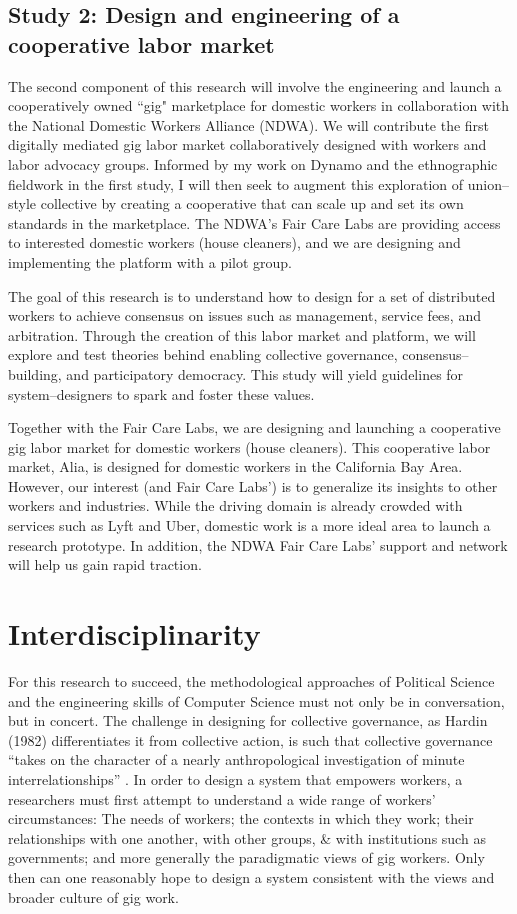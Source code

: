 \documentclass{article}
\begin{document}
\subsection*{Study 2: Design and engineering of a cooperative labor market}
The second component of this research will involve
the engineering and launch a cooperatively owned ``gig" marketplace for domestic workers
in collaboration with the National Domestic Workers Alliance
(NDWA).
We will contribute the first digitally mediated gig labor market collaboratively designed with
workers and labor advocacy groups.
Informed by my work on Dynamo and the ethnographic fieldwork in the first study,
I will then seek to augment this exploration of union--style collective by creating a cooperative that can scale up and set its own standards in the marketplace.
The NDWA's Fair Care Labs are providing access to interested domestic workers
(house cleaners), and we are designing and implementing the platform with a pilot group.

The goal of this research is
to understand how to design for a set of distributed workers to achieve consensus on issues such as
management, service fees, and arbitration.
Through the creation of this labor market and platform, we will explore and test theories behind
enabling collective governance, consensus--building, and participatory democracy.
This study will yield guidelines for system--designers to spark and foster these values.

Together with the Fair Care Labs, we are designing and launching a cooperative gig labor market for domestic workers (house cleaners).
This cooperative labor market, Alia, is designed for domestic workers in the California Bay Area.
However, our interest (and Fair Care Labs') is to generalize its insights to other workers and industries.
While the driving domain is already crowded with services such as Lyft and Uber, domestic work is a more ideal area to launch a research prototype.
In addition, the NDWA Fair Care Labs' support and network will help us gain rapid traction.


\section*{Interdisciplinarity}
For this research to succeed, the methodological approaches of Political Science
and the engineering skills of Computer Science must not only be in conversation, but in concert.
The challenge in designing for collective governance,
as Hardin (1982) differentiates it from collective action,
is such that collective governance
``takes on the character of a nearly anthropological investigation of minute interrelationships''
\citep{russell1982collective}.
In order to design a system that empowers workers,
a researchers must first attempt to understand a wide range of workers' circumstances:
The needs of workers;
the contexts in which they work;
their relationships with one another, with other groups, \& with institutions such as governments;
and more generally the paradigmatic views of gig workers.
Only then can one reasonably hope to design a system consistent with the views and broader culture of gig work.
\end{document}

